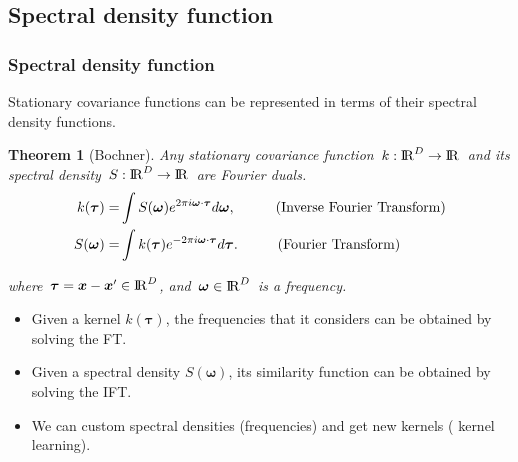 \documentclass[8pt]{beamer} %
\newtheorem*{thm}{Theorem}
\begin{document}
\subsection*{Spectral density function}
\begin{frame}\frametitle{\normalsize Spectral density function}

\vspace{-2mm}
Stationary covariance functions can be represented in terms of their {\color{navyblue} spectral density functions}.

\vspace{2mm}
\begin{thm}[Bochner]
Any {\color{navyblue} stationary covariance function}\, $k:{\rm I\!R}^{D} \to {\rm I\!R}$\, and its {\color{navyblue} spectral density}\, $S:{\rm I\!R}^{D} \to {\rm I\!R}$\, are Fourier duals.
\vspace{-1mm}
\begin{align*}
k(\bm{\tau})=& \int S(\bm{\omega}) e^{2\pi i \bm{\omega} \cdot \bm{\tau}} d\bm{\omega}, \hspace{10mm} \text{(Inverse Fourier Transform)} \nonumber \\
%
S(\bm{\omega})=& \int k(\bm{\tau}) e^{-2\pi i \bm{\omega} \cdot \bm{\tau}} d\bm{\tau}. \hspace{10mm} \text{(Fourier Transform)}  \nonumber
\end{align*}

where\, $\bm{\tau}=\bm{x}-\bm{x}' \in {\rm I\!R}^{D}$, and\, $\bm{\omega} \in {\rm I\!R}^{D}$\, is a frequency.
\end{thm}

\vspace{2mm}
\begin{adjustwidth}{-0.2em}{-0.2em}
\begin{itemize}\setlength\itemsep{2mm}
\item Given a {\color{navyblue} kernel} $k(\bm{\tau})$, the {\color{navyblue} frequencies} that it considers can be obtained by solving the FT.

\item Given a {\color{navyblue} spectral density} $S(\bm{\omega})$, its {\color{navyblue} similarity function} can be obtained by solving the IFT.

\item We can custom spectral densities (frequencies) and get new kernels ({\color{navyblue} kernel learning}).
\end{itemize}
\end{adjustwidth}

\end{frame}
\end{document}
